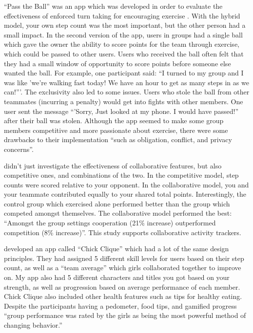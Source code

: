 \documentclass{l4proj}
\begin{document}
``Pass the Ball'' was an app which was developed in order to evaluate the effectiveness of enforced turn taking for encouraging exercise \citep{Pass_the_ball}. With the hybrid model, your own step count was the most important, but the other person had a small impact. In the second version of the app, users in groups had a single ball which gave the owner the ability to score points for the team through exercise, which could be passed to other users. Users who received the ball often felt that they had a small window of opportunity to score points before someone else wanted the ball. For example, one participant said: ``I turned to my group and I was like 'we’re walking fast today! We have an hour to get as many steps in as we can!'''. The exclusivity also led to some issues. Users who stole the ball from other teammates (incurring a penalty) would get into fights with other members. One user sent the message ``'Sorry, Just looked at my phone. I would have passed!'' after their ball was stolen. Although the app seemed to make some group members competitive and more passionate about exercise, there were some drawbacks to their implementation ``such as obligation, conflict, and privacy concerns''.

\citet{HealthyTogether} didn't just investigate the effectiveness of collaborative features, but also competitive ones, and combinations of the two. In the competitive model, step counts were scored relative to your opponent. In the collaborative model, you and your teammate contributed equally to your shared total points. Interestingly, the control group which exercised alone performed better than the group which competed amongst themselves. The collaborative model performed the best: ``Amongst the group settings cooperation (21\% increase) outperformed competition (8\% increase)''. This study supports collaborative activity trackers.

\citet{ChickClique} developed an app called ``Chick Clique'' which had a lot of the same design principles. They had assigned 5 different skill levels for users based on their step count, as well as a ``team average'' which girls collaborated together to improve on. My app also had 5 different characters and titles you got based on your strength, as well as progression based on average performance of each member. Chick Clique also included other health features such as tips for healthy eating. Despite the participants having a pedometer, food tips, and gamified progress ``group performance was rated by the girls as being the most powerful method of changing behavior.'' 
\end{document}
